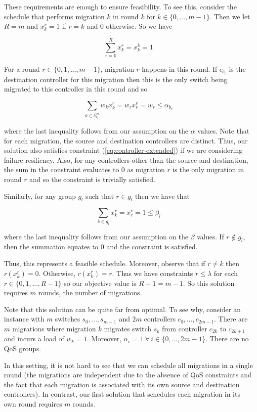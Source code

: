 \documentclass[letterpaper,12pt,titlepage,oneside,final]{article}
\begin{document}
These requirements are enough to ensure feasibility. To see this, consider the schedule that performs migration $k$ in round $k$ for $k \in \{0, ..., m - 1\}$. Then we let $R = m$ and $x^{r}_{k} = 1$ if $r = k$ and 0 otherwise. So we have

$$\sum_{r=0}^{R} x^{r}_{k} = x^{k}_{k} = 1$$

For a round $r \in \{0, 1, ..., m - 1\}$, migration $r$ happens in this round. If $c_{b_{r}}$ is the destination controller for this migration then this is the only switch being migrated to this controller in this round and
so

$$\sum_{k \in \delta^{in}_{b_{r}}} w_{k}x^{r}_{k} = w_{r}x^{r}_{r} = w_{r} \leq \alpha_{b_{r}}$$

where the last inequality follows from our assumption on the $\alpha$ values. Note that for each migration, the source and destination controllers are distinct. Thus, our solution also satisfies constraint (\ref{eq:controller-extended}) if we are considering failure resiliency. Also, for any controllers other than the source and destination, the sum in the constraint evaluates to 0 as migration $r$ is the only migration in round $r$ and so the constraint is trivially satisfied.

Similarly, for any group $g_{l}$ such that $r \in g_{l}$ then we have that

$$\sum_{k \in g_{l}} x^{r}_{k} = x^{r}_{r} = 1 \leq \beta_{l}$$

where the last inequality follows from our assumption on the $\beta$ values. If $r \notin g_{l}$, then the summation equates to 0 and the constraint is satisfied. 

Thus, this represents a feasible schedule. Moreover, observe that if $r \neq k$ then $r(x^{r}_{k}) = 0$. Otherwise, $r(x^{r}_{k}) = r$. Thus we have constraints $r \leq \lambda$ for each $r \in \{0, 1, ..., R - 1\}$ so our objective value is $R - 1 = m - 1$. So this solution requires $m$ rounds, the number of migrations.

Note that this solution can be quite far from optimal. To see why, consider an instance with $m$ switches $s_{0}, ..., s_{m-1}$ and $2m$ controllers $c_{0}, ..., c_{2m - 1}$. There are $m$ migrations where migration $k$ migrates switch $s_{k}$ from controller $c_{2k}$ to $c_{2k + 1}$ and incurs a load of $w_{k} = 1$. Moreover, $\alpha_{i} = 1$ $\forall \, i \in \{0, ..., 2m - 1\}$. There are no QoS groups.

In this setting, it is not hard to see that we can schedule all migrations in a single round (the migrations are independent due to the absence of QoS constraints and the fact that each migration is associated with its own source and destination controllers). In contrast, our first solution that schedules each migration in its own round requires $m$ rounds.
\end{document}
